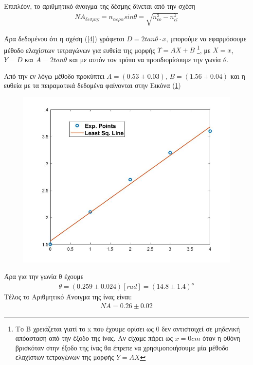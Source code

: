 \documentclass[a4paper]{article}
\begin{document}
		Επιπλέον, το αριθμητικό άνοιγμα της δέσμης δίνεται από την σχέση 
	\begin{align}		
		NA_{δεσμης} = n_{αερα}sin\theta=\sqrt{n_{co}^2-n_{cl}^2} 
	\end{align}
	
	Άρα δεδομένου ότι η σχέση (\ref{4}) γράφεται $D = 2tan\theta\cdot x$, μπορούμε να εφαρμόσουμε μέθοδο ελαχίστων τετραγώνων για ευθεία της μορφής $Υ = ΑX+B$ \footnote{Το Β χρειάζεται γιατί το x που έχουμε ορίσει ως 0 δεν αντιστοιχεί σε μηδενική απόασταση από την έξοδο της ίνας. Αν είχαμε πάρει ως $x=0cm$ όταν η οθόνη βρισκόταν στην έξοδο της ίνας θα έπρεπε να χρησιμοποιήσουμε μία μέθοδο ελαχίστων τετραγώνων της μορφής $Y=AX$}, με $X = x$, $Y=D$ και  $A=2tan\theta$ και με αυτόν τον τρόπο να προσδιορίσουμε την γωνία $\theta$.
	 
	Από την εν λόγω μέθοδο προκύπτει   $A = (0.53\pm0.03)$, $B=(1.56\pm0.04)$ και η ευθεία με τα πειραματικά δεδομένα φαίνονται στην Εικόνα (\ref{Im2}) 
	
	\begin{figure}[h!]
		\centering
		\includegraphics[scale=0.5]{NA.jpg}
		\caption{ }
		\label{Im2}
	\end{figure}
	
	
	Άρα για την γωνία θ έχουμε\footnotemark
		\begin{align*}
			\theta = ( 0.259\pm 0.024) [rad] = (14.8 \pm 1.4) ^o
		\end{align*}
	Τέλος το Αριθμητικό Άνοιγμα της ίνας είναι: \footnotemark
		\begin{align*}
			\boxed{NA = 0.26 \pm 0.02 }
		\end{align*}
		
\end{document}
